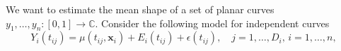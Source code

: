 We want to estimate the mean shape of a set of planar curves $y_1,\dots,y_n : [0,1] \rightarrow \mathbb{C}$.
Consider the following model for independent curves
\begin{equation}
  Y_i(t_{ij}) = \mu(t_{ij}, \mathbf{x}_i) + E_i(t_{ij}) + \epsilon(t_{ij}),
    \quad j = 1,\dots,D_i, \, i = 1,\dots,n,
\end{equation}
